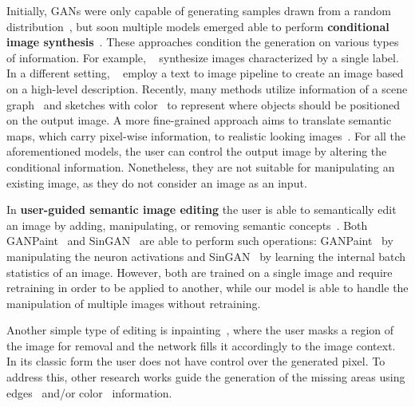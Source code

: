 \documentclass[runningheads]{llncs}
\begin{document}
Initially, GANs were only capable of generating samples drawn from a random distribution~\cite{goodfellowGAN}, but soon multiple models emerged able to perform \textbf{conditional image synthesis}~\cite{mirza2014conditional,odena2016conditional}.
These approaches condition the generation on various types of information.
For example, ~\cite{mirza2014conditional,miyato2018cgans,Han18,brock2018large} synthesize images characterized by a single label.
In a different setting, ~\cite{reed2016generative,han2017stackgan,stackgan++,attngan} employ a text to image pipeline to create an image based on a high-level description.
Recently, many methods utilize information of a scene graph~\cite{Johnson_2018_CVPR,Ashual_2019_ICCV} and sketches with color~\cite{sangkloy2016scribbler} to represent where objects should be positioned on the output image. 
A more fine-grained approach aims to translate semantic maps, which carry pixel-wise information, to realistic looking images~\cite{isola2017image,wang2018pix2pixHD,park2019SPADE,lee2019maskgan}. For all the aforementioned models, the user can control the output image by altering the conditional information. Nonetheless, they are not suitable for manipulating an existing image, as they do not consider an image as an input.

In \textbf{user-guided semantic image editing} the user is able to semantically edit an image by adding, manipulating, or removing semantic concepts~\cite{Bau_Ganpaint_2019}.
Both GANPaint~\cite{Bau_Ganpaint_2019} and SinGAN~\cite{Shaham_2019_ICCV} are able to perform such operations: GANPaint~\cite{Bau_Ganpaint_2019} by manipulating the neuron activations and SinGAN~\cite{Shaham_2019_ICCV} by learning the internal batch statistics of an image.
However, both are trained on a single image and require retraining in order to be applied to another, while our model is able to handle the manipulation of multiple images without retraining. 


Another simple type of editing is inpainting~\cite{iizuka2017globally,yu2018generative,liu2018image}, where the user masks a region of the image for removal and the network fills it accordingly to the image context. 
In its classic form the user does not have control over the generated pixel.
To address this, other research works guide the generation of the missing areas using edges~\cite{yu2018free,nazeri2019edgeconnect} and/or color~\cite{faceshop,Jo_2019_ICCV} information.
\end{document}
